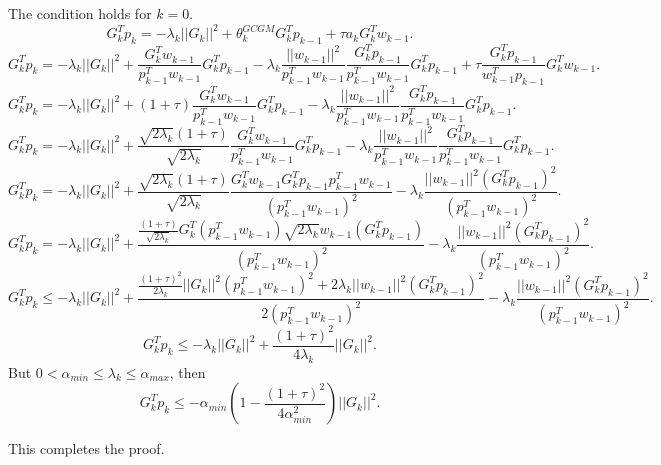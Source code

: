 \documentclass{article}
\theoremstyle{remark}
\begin{document}
The condition holds for $k=0$.
\[
G_k^Tp_k=-\lambda_k ||G_k||^2+\theta_k^{GCGM}G_k^Tp_{k-1}+\tau a_kG_k^Tw_{k-1}.
\]
\[
G_k^Tp_k=-\lambda_k ||G_k||^2+\frac{G_k^Tw_{k-1}}{p_{k-1}^Tw_{k-1}}G_k^Tp_{k-1}-\lambda_k\frac{||w_{k-1}||^2}{p_{k-1}^Tw_{k-1}}\frac{G_k^Tp_{k-1}}{p_{k-1}^Tw_{k-1}}G_k^Tp_{k-1}+\tau \frac{G_k^Tp_{k-1}}{w_{k-1}^Tp_{k-1}}G_k^Tw_{k-1}.
\]
\[
G_k^Tp_k=-\lambda_k ||G_k||^2+(1+\tau)\frac{G_k^Tw_{k-1}}{p_{k-1}^Tw_{k-1}}G_k^Tp_{k-1}-\lambda_k\frac{||w_{k-1}||^2}{p_{k-1}^Tw_{k-1}}\frac{G_k^Tp_{k-1}}{p_{k-1}^Tw_{k-1}}G_k^Tp_{k-1}.
\]
\[
G_k^Tp_k=-\lambda_k ||G_k||^2+\frac{\sqrt{2\lambda_k}(1+\tau)}{\sqrt{2\lambda_k}}\frac{G_k^Tw_{k-1}}{p_{k-1}^Tw_{k-1}}G_k^Tp_{k-1}-\lambda_k\frac{||w_{k-1}||^2}{p_{k-1}^Tw_{k-1}}\frac{G_k^Tp_{k-1}}{p_{k-1}^Tw_{k-1}}G_k^Tp_{k-1}.
\]
\[
G_k^Tp_k=-\lambda_k ||G_k||^2+\frac{\sqrt{2\lambda_k}(1+\tau)}{\sqrt{2\lambda_k}}\frac{G_k^Tw_{k-1}G_k^Tp_{k-1}p_{k-1}^Tw_{k-1}}{(p_{k-1}^Tw_{k-1})^2}-\lambda_k\frac{||w_{k-1}||^2(G_k^Tp_{k-1})^2}{(p_{k-1}^Tw_{k-1})^2}.
\]
\[
G_k^Tp_k=-\lambda_k ||G_k||^2+\frac{\frac{(1+\tau)}{\sqrt{2\lambda_k}}G_k^T(p_{k-1}^Tw_{k-1})\sqrt{2\lambda_k}w_{k-1}(G_k^Tp_{k-1})}{(p_{k-1}^Tw_{k-1})^2}-\lambda_k\frac{||w_{k-1}||^2(G_k^Tp_{k-1})^2}{(p_{k-1}^Tw_{k-1})^2}.
\]
\[
G_k^Tp_k\leq -\lambda_k ||G_k||^2+\frac{\frac{(1+\tau)^2}{2\lambda_k}||G_k||^2(p_{k-1}^Tw_{k-1})^2+2\lambda_k
||w_{k-1}||^2(G_k^Tp_{k-1})^2}{2(p_{k-1}^Tw_{k-1})^2}-\lambda_k\frac{||w_{k-1}||^2(G_k^Tp_{k-1})^2}{(p_{k-1}^Tw_{k-1})^2}.
\]
\[
G_k^Tp_k\leq -\lambda_k ||G_k||^2+\frac{(1+\tau)^2}{4\lambda_k}||G_k||^2.
\]
But $0<\alpha_{min}\leq\lambda_k\leq \alpha_{max}$, then 
\begin{equation}
\label{eq:cgpmsuffientcondition}
    G_k^Tp_k\leq -\alpha_{min}(1-\frac{(1+\tau)^2}{4\alpha_{min}^2})||G_k||^2.
\end{equation}


This completes the proof.
\newpage
\end{document}
